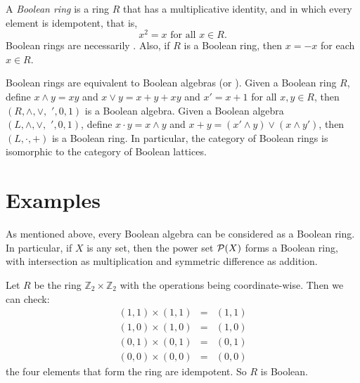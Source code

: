 \documentclass[12pt]{article}
\newcommand{\Z}{\mathbb{Z}}
\begin{document}

A \emph{Boolean ring} is a ring $R$ that has a multiplicative identity,
and in which every element is idempotent, that is, 
$$x^2=x\text{ for all }x\in R.$$
Boolean rings are necessarily .
Also, if $R$ is a Boolean ring, then $x=-x$ for each $x\in R$.

Boolean rings are equivalent to Boolean algebras (or ).
Given a Boolean ring $R$, 
define $x \land y = xy$ and $x \lor y = x + y + xy$ and $x'=x+1$
for all $x,y\in R$, 
then $(R,\land,\lor,\phantom{i}',0,1)$ is a Boolean algebra.
Given a Boolean algebra $(L,\land,\lor,\phantom{i}',0,1)$,
define $x\cdot y = x \land y$ and $x + y = (x' \land y) \lor (x \land y')$,
then $(L,\cdot,+)$ is a Boolean ring.
In particular, the category of Boolean rings is isomorphic to the category of Boolean lattices.

\section*{Examples}

As mentioned above, every Boolean algebra can be considered as a Boolean ring. In particular, if $X$ is any set, then the power set ${\cal P}(X)$ forms a Boolean ring, with intersection as multiplication and symmetric difference as addition.

Let $R$ be the ring $\Z_2\times\Z_2$ with the operations being coordinate-wise.
Then we can check:
\begin{eqnarray*}
(1,1)\times(1,1)&=&(1,1)\\
(1,0)\times(1,0)&=&(1,0)\\
(0,1)\times(0,1)&=&(0,1)\\
(0,0)\times(0,0)&=&(0,0)
\end{eqnarray*}
the four elements that form the ring are idempotent. So $R$ is Boolean.
\end{document}

